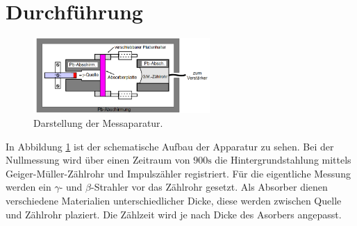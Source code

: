 \section{Durchführung}
\label{sec:Durchführung}
\begin{figure}
  \centering
  \includegraphics[width=0.6\textwidth]{aufbau.PNG}
  \caption{Darstellung der Messaparatur.\cite{sample}}
  \label{fig:aufbau}
\end{figure}
In Abbildung \ref{fig:aufbau} ist der schematische Aufbau der Apparatur zu sehen.
Bei der Nullmessung wird über einen Zeitraum von $900\si{\second}$ die Hintergrundstahlung mittels
Geiger-Müller-Zählrohr und Impulszähler registriert.
Für die eigentliche Messung werden ein $\gamma$- und $\beta$-Strahler vor das Zählrohr gesetzt. Als Absorber
dienen verschiedene Materialien unterschiedlicher Dicke, diese werden zwischen Quelle und Zählrohr plaziert.
Die Zählzeit wird je nach Dicke des Asorbers angepasst.
